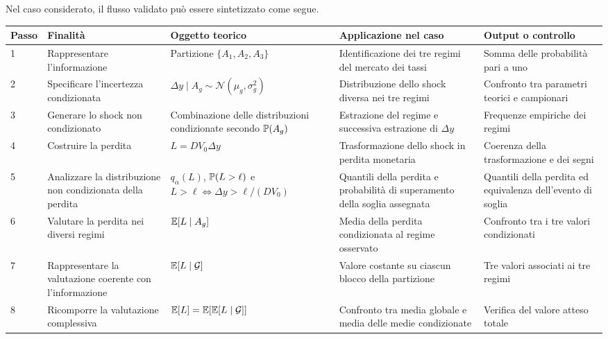 Nel caso considerato, il flusso validato pu\`{o} essere sintetizzato come
segue.

\begin{center}
\small
\begin{tabular}{p{0.8cm}p{2.7cm}p{3.6cm}p{3.5cm}p{2.4cm}}
\textbf{Passo} &
\textbf{Finalit\`{a}} &
\textbf{Oggetto teorico} &
\textbf{Applicazione nel caso} &
\textbf{Output o controllo}
\\ \hline

1 &
Rappresentare l'informazione &
Partizione
$\{A_{1},A_{2},A_{3}\}$ &
Identificazione dei tre regimi del mercato dei tassi &
Somma delle probabilit\`{a} pari a uno
\\

2 &
Specificare l'incertezza condizionata &
$\Delta y\mid A_{g}\sim
\mathcal{N}(\mu_{g},\sigma_{g}^{2})$ &
Distribuzione dello shock diversa nei tre regimi &
Confronto tra parametri teorici e campionari
\\

3 &
Generare lo shock non condizionato &
Combinazione delle distribuzioni condizionate secondo
$\mathbb{P}(A_{g})$ &
Estrazione del regime e successiva estrazione di $\Delta y$ &
Frequenze empiriche dei regimi
\\

4 &
Costruire la perdita &
$L=D V_{0}\Delta y$ &
Trasformazione dello shock in perdita monetaria &
Coerenza della trasformazione e dei segni
\\

5 &
Analizzare la distribuzione non condizionata della perdita &
$q_\alpha(L)$, $\mathbb{P}(L>\ell)$ e
$L>\ell\Longleftrightarrow
\Delta y>\ell/(D V_{0})$ &
Quantili della perdita e probabilit\`{a} di superamento della soglia assegnata &
Quantili della perdita ed equivalenza dell'evento di soglia
\\

6 &
Valutare la perdita nei diversi regimi &
$\mathbb{E}[L\mid A_{g}]$ &
Media della perdita condizionata al regime osservato &
Confronto tra i tre valori condizionati
\\

7 &
Rappresentare la valutazione coerente con l'informazione &
$\mathbb{E}[L\mid\mathcal{G}]$ &
Valore costante su ciascun blocco della partizione &
Tre valori associati ai tre regimi
\\

8 &
Ricomporre la valutazione complessiva &
$\mathbb{E}[L]=\mathbb{E}[\mathbb{E}[L\mid\mathcal{G}]]$ &
Confronto tra media globale e media delle medie condizionate &
Verifica del valore atteso totale
\end{tabular}
\end{center}

